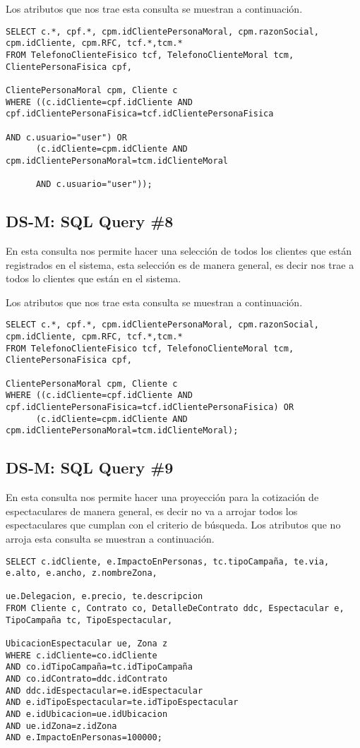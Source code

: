 Los atributos que nos trae esta consulta se muestran a continuación.
\begin{verbatim}
SELECT c.*, cpf.*, cpm.idClientePersonaMoral, cpm.razonSocial, cpm.idCliente, cpm.RFC, tcf.*,tcm.*
FROM TelefonoClienteFisico tcf, TelefonoClienteMoral tcm, ClientePersonaFisica cpf,

ClientePersonaMoral cpm, Cliente c
WHERE ((c.idCliente=cpf.idCliente AND cpf.idClientePersonaFisica=tcf.idClientePersonaFisica 

AND c.usuario="user") OR 
	  (c.idCliente=cpm.idCliente AND cpm.idClientePersonaMoral=tcm.idClienteMoral 
	  
	  AND c.usuario="user"));
\end{verbatim}



\subsection{DS-M: SQL Query \#8}
En esta consulta nos permite hacer una selección de todos los clientes que están registrados en el sistema, esta selección es de manera general, es decir nos trae a todos lo clientes que están en el sistema.

Los atributos que nos trae esta consulta se muestran a continuación.
\begin{verbatim}
SELECT c.*, cpf.*, cpm.idClientePersonaMoral, cpm.razonSocial, cpm.idCliente, cpm.RFC, tcf.*,tcm.*
FROM TelefonoClienteFisico tcf, TelefonoClienteMoral tcm, ClientePersonaFisica cpf,

ClientePersonaMoral cpm, Cliente c
WHERE ((c.idCliente=cpf.idCliente AND cpf.idClientePersonaFisica=tcf.idClientePersonaFisica) OR 
	  (c.idCliente=cpm.idCliente AND cpm.idClientePersonaMoral=tcm.idClienteMoral);
\end{verbatim}


\subsection{DS-M: SQL Query \#9}
En esta consulta nos permite hacer una proyección para la cotización de espectaculares de manera general, es decir no va a arrojar todos los espectaculares que cumplan con el criterio de búsqueda.
Los atributos que no arroja esta consulta se muestran a continuación.
\begin{verbatim}
SELECT c.idCliente, e.ImpactoEnPersonas, tc.tipoCampaña, te.via, e.alto, e.ancho, z.nombreZona,

ue.Delegacion, e.precio, te.descripcion
FROM Cliente c, Contrato co, DetalleDeContrato ddc, Espectacular e, TipoCampaña tc, TipoEspectacular, 

UbicacionEspectacular ue, Zona z
WHERE c.idCliente=co.idCliente
AND co.idTipoCampaña=tc.idTipoCampaña
AND co.idContrato=ddc.idContrato
AND ddc.idEspectacular=e.idEspectacular
AND e.idTipoEspectacular=te.idTipoEspectacular
AND e.idUbicacion=ue.idUbicacion
AND ue.idZona=z.idZona
AND e.ImpactoEnPersonas=100000;
\end{verbatim}


